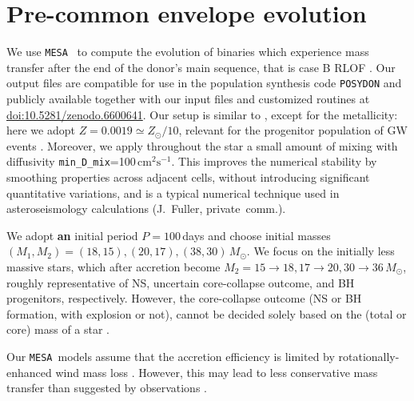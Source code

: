 \documentclass[twocolumn,twocolappendix,trackchanges]{aastex63}
\newcommand{\code}[1]{\texttt{#1}}
\newcommand{\mesa}{\code{MESA}}
\begin{document}
\section{Pre-common envelope evolution}
\label{sec:methods}

We use \mesa\ \citep[version 15140,][]{paxton:2011, paxton:2013,
  paxton:2015, paxton:2018, paxton:2019} to compute the evolution of
binaries which experience mass transfer after the end of the donor's
main sequence, that is case B RLOF
\citep[][]{kippenhahn:1967}. Our output files are compatible for
use in the population synthesis code \code{POSYDON}
\citep{fragos:2022} and publicly available together with our input
files and customized routines at
\href{https://zenodo.org/deposit/6600641}{doi:10.5281/zenodo.6600641}.
Our setup is similar to \cite{renzo:2021zoph}, except for the
metallicity: here we adopt $Z=0.0019\simeq Z_\odot/10$, relevant for
the progenitor population of GW events \citep[e.g.,][]{vanson:2021}.
Moreover, we apply throughout the star a small amount of mixing with
diffusivity \texttt{min\_D\_mix}=100\,$\mathrm{cm^2 s^{-1}}$. This
improves the numerical stability by smoothing properties across
adjacent cells, without introducing significant quantitative
variations, and is a typical numerical technique used in
asteroseismology calculations (J.~Fuller, private~comm.).

We adopt \textcolor{green!80!black}{\bf an} initial period $P=100$\,days and choose initial masses
$(M_{1}, M_{2}) = (18, 15), (20, 17), (38, 30)\,M_\odot$. We focus on
the initially less massive stars, which after accretion become
$M_2=15\rightarrow 18, 17\rightarrow 20, 30\rightarrow 36\,M_\odot$,
roughly representative of NS, uncertain core-collapse outcome, and BH
progenitors, respectively. However, the core-collapse outcome (NS or
BH formation, with explosion or not), cannot be decided solely based
on the (total or core) mass of a star \citep[e.g.,][]{oconnor:11,
  farmer:16, patton:20, zapartas:21b, patton:22}.

Our \mesa\ models assume that the accretion efficiency is limited by
rotationally-enhanced wind mass loss \citep[e.g.,][]{sravan:2019,
  wang:2020, renzo:2021zoph, sen:2022}. However, this may lead to less
conservative mass transfer than suggested by observations
\citep[e.g.,][]{wang:2021a,renzo:2021zoph}.
\end{document}
